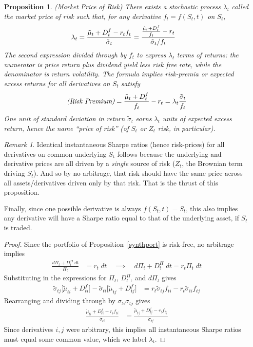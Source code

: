 \documentclass[12pt]{article}
\theoremstyle{plain}
\newtheorem{prop}[thm]{Proposition}
\theoremstyle{definition}
\theoremstyle{remark}
\newtheorem*{rmk}{Remark}
\begin{document}
\begin{prop}\emph{(Market Price of Risk)}
\label{prop:lambda}
There exists a stochastic process $\lambda_t$ called the
\emph{market price of risk} such that, for any derivative
$f_{t}=f(S_t,t)$ on $S_t$,
\begin{align}
  \lambda_t
  &=
  \frac{%
    \tilde{\mu}_{t}+D_{t}^f
    -
    r_tf_{t}
  }{\tilde{\sigma}_{t}}
  =
  \frac{%
    \frac{\tilde{\mu}_{t}+D_{t}^f}{f_{t}}
    -
    r_t
  }{\tilde{\sigma}_{t}/f_{t}}
  \label{lambda}
\end{align}
The second expression divided through by $f_{t}$ to express $\lambda_t$
terms of returns: the numerator is price return plus dividend yield less
risk free rate, while the denominator is return volatility.
The formula implies risk-premia or expected excess returns
for \emph{all} derivatives on $S_t$ satisfy
\begin{align*}
  \text{\emph{(Risk Premium)}}
  =
  \frac{\tilde{\mu}_t+D_{t}^f}{f_{t}}
  -
  r_t
  =
  \lambda_t\frac{\tilde{\sigma}_{t}}{f_{t}}
\end{align*}
One unit of standard deviation in return $\tilde{\sigma}_t$ earns
$\lambda_t$ units of expected excess return, hence the name ``price of
risk'' (of $S_t$ or $Z_t$ risk, in particular).
\end{prop}
\begin{rmk}
Identical instantaneous Sharpe ratios (hence risk-prices) for all
derivatives on common underlying $S_t$ follows because the underlying
and derivative prices are all driven by a \emph{single} source of risk
($Z_t$, the Brownian term driving $S_t$).
And so by no arbitrage, that risk should have the same price across all
assets/derivatives driven only by that risk.
That is the thrust of this proposition.

Finally, since one possible derivative is always $f(S_t,t)=S_t$, this
also implies any derivative will have a Sharpe ratio equal to that of
the underlying asset, if $S_t$ is traded.
\end{rmk}
\begin{proof}
Since the portfolio of Proposition~\ref{synthport} is risk-free, no
arbitrage implies
\begin{align*}
  \frac{d\Pi_t + D_t^\Pi\;dt}{\Pi_t}
  &= r_t\; dt
  \quad\implies\quad
  d\Pi_t  + D_t^\Pi\;dt
  = r_t\Pi_t\; dt
\end{align*}
Substituting in the expressions for $\Pi_t$, $D_t^\Pi$, and $d\Pi_t$
gives
\begin{align*}
  \tilde{\sigma}_{tj}
  \big[\tilde{\mu}_{ti}+D_{ti}^f\big]
  -
  \tilde{\sigma}_{ti}
  \big[\tilde{\mu}_{tj}+D_{tj}^f\big]
  &=
  r_t \tilde{\sigma}_{tj}
  f_{ti}
  - r_t\tilde{\sigma}_{ti}
  f_{tj}
\end{align*}
Rearranging and dividing through by $\sigma_{ti}\sigma_{tj}$ gives
\begin{align*}
  \frac{\tilde{\mu}_{ti}+D_{ti}^f-r_t f_{ti}}{\tilde{\sigma}_{ti}}
  &=
  \frac{\tilde{\mu}_{tj}+D_{tj}^f-r_t f_{tj}}{\tilde{\sigma}_{tj}}
\end{align*}
Since derivatives $i,j$ were arbitrary, this implies all instantaneous
Sharpe ratios must equal some common value, which we label $\lambda_t$.
\end{proof}
\end{document}
